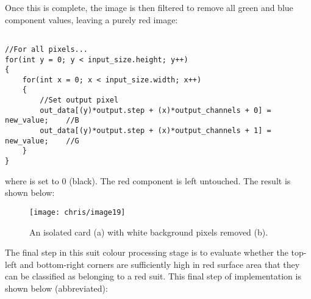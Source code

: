 		Once this is complete, the image is then filtered to remove all green and blue component values, leaving a purely red image:
		
		\begin{lstlisting}

//For all pixels...
for(int y = 0; y < input_size.height; y++)
{
	for(int x = 0; x < input_size.width; x++)
	{
		//Set output pixel              
		out_data[(y)*output.step + (x)*output_channels + 0] = new_value;    //B
		out_data[(y)*output.step + (x)*output_channels + 1] = new_value;    //G 
	}
}
		\end{lstlisting}

		where  is set to 0 (black). The red component is left untouched. The result is shown below:

		\begin{figure}[H]
			\centering
			\texttt{[image: chris/image19]}
			\caption{An isolated card (a) with white background pixels removed (b).}
			\label{fig:redchan}
		\end{figure}

		The final step in this suit colour processing stage is to evaluate whether the top-left and bottom-right corners are sufficiently high in red surface area that they can be classified as belonging to a red suit. This final step of implementation is shown below (abbreviated):

